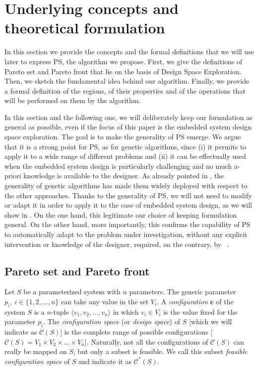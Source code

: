 
\section{Underlying concepts and theoretical formulation}

In this section we provide the concepts and the formal
definitions that we will use later to express PS, the algorithm we
propose.  First, we give the definitions of Pareto set and Pareto
front that lie on the basis of Design Space Exploration.
Then, we sketch the fundamental idea behind our algorithm. Finally, we
provide a formal definition of the regions, of their properties and of
the operations that will be performed on them by the algorithm.

In this section and the following one, we will deliberately keep our formulation as general as possible, even if the focus of this paper is the embedded system design space exploration. The goal is to make the generality of PS emerge. We argue that it is a strong point for PS, as for genetic algorithms, since (i) it permits to apply it to a wide range of different problems and (ii) it can be effectually used when the embedded system design is particularly challenging and no much a-priori knowledge is available to the designer. As already pointed in , the generality of genetic algorithms has made them widely deployed with respect to the other approaches.
Thanks to the generality of PS, we will not need to modify or adapt it in order to apply it to the case of embedded system design, as we will show in . On the one hand, this legitimate our choice of keeping formulation general. On the other hand, more importantly, this confirms the capability of PS to automatically adapt to the problem under investigation, without any explicit intervention or knowledge of the designer, required, on the contrary, by~\cite{givargis_tvlsi02,santosh_hptr00,dellnitz2005covering} .

\subsection{Pareto set and Pareto front}

Let $S$ be a parameterized system with $n$ parameters. The generic
parameter $p_i, \ i \in \{1,2,\ldots,n\}$ can take any value in
the set $V_i$. A {\em configuration} $\mathbf{c}$ of the system
$S$ is a $n$-tuple $\langle v_1,v_2,\ldots,v_n \rangle$ in which
$v_i \in V_i$ is the value fixed for the parameter $p_i$. The {\em
configuration space} (or {\em design space}) of $S$ [which we will
indicate as $\mathcal{C}(S)$] is the complete range of possible
configurations [$\mathcal{C}(S) = V_1 \times V_2 \times \ldots
\times V_n$]. Naturally, not all the configurations of
$\mathcal{C}(S)$ can really be mapped on $S$, but only a subset 
is feasible. We call this subset {\em
feasible configuration space} of $S$ and indicate it as
$\mathcal{C}^*(S)$.

